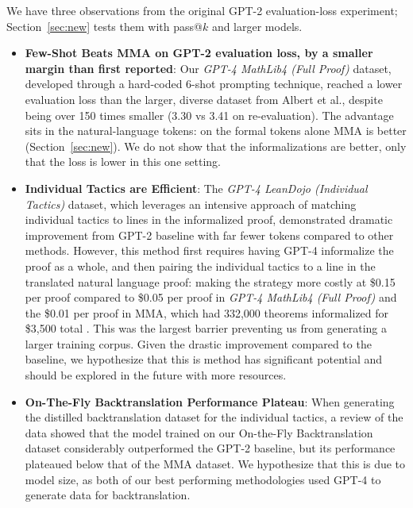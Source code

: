 \documentclass{article} %
\begin{document}
We have three observations from the original GPT-2 evaluation-loss experiment; Section~\ref{sec:new} tests them with pass@$k$ and larger models.
\begin{itemize}
    \item \textbf{Few-Shot Beats MMA on GPT-2 evaluation loss, by a smaller margin than first reported}: Our \textit{GPT-4 MathLib4 (Full Proof)} dataset, developed through a hard-coded 6-shot prompting technique, reached a lower evaluation loss than the larger, diverse dataset from Albert et al., despite being over 150 times smaller (3.30 vs 3.41 on re-evaluation). The advantage sits in the natural-language tokens: on the formal tokens alone MMA is better (Section~\ref{sec:new}). We do not show that the informalizations are better, only that the loss is lower in this one setting.

    \item \textbf{Individual Tactics are Efficient}: The \textit{GPT-4 LeanDojo (Individual Tactics)} dataset, which leverages an intensive approach of matching individual tactics to lines in the informalized proof, demonstrated dramatic improvement from GPT-2 baseline with far fewer tokens compared to other methods. However, this method first requires having GPT-4 informalize the proof as a whole, and then pairing the individual tactics to a line in the translated natural language proof: making the strategy more costly at \$0.15 per proof compared to \$0.05 per proof in \textit{GPT-4 MathLib4 (Full Proof)} and the \$0.01 per proof in MMA, which had 332,000 theorems informalized for \$3,500 total \citep{mma}. This was the largest barrier preventing us from generating a larger training corpus. Given the drastic improvement compared to the baseline, we hypothesize that this is method has significant potential and should be explored in the future with more resources. 

    \item \textbf{On-The-Fly Backtranslation Performance Plateau}: When generating the distilled backtranslation dataset for the individual tactics, a review of the data showed that the model trained on our On-the-Fly Backtranslation dataset considerably outperformed the GPT-2 baseline, but its performance plateaued below that of the MMA dataset. We hypothesize that this is due to model size, as both of our best performing methodologies used GPT-4 to generate data for backtranslation.
\end{itemize}
\end{document}
